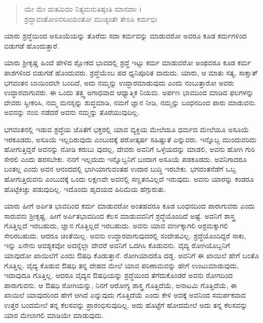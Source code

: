 \begin{verse}
ಯೇ ಮೇ ಮತಮಿದಂ ನಿತ್ಯಮನುತಿಷ್ಠಂತಿ ಮಾನವಾಃ ।\\ಶ್ರದ್ಧಾವಂತೋಽನಸೂಯಂತೋ ಮುಚ್ಯಂತೇ ತೇಽಪಿ ಕರ್ಮಭಿಃ 
\end{verse}

{\small ಯಾರು ಶ್ರದ್ಧೆಯಿಂದ ಅಸೂಯೆಯನ್ನು ತೊರೆದು ಸದಾ ಕರ್ಮವನ್ನು ಮಾಡುವರೋ ಅವರೂ ಕೂಡ ಕರ್ಮಗಳಿಂದ ಬಿಡುಗಡೆ ಹೊಂದುತ್ತಾರೆ.}

ಯಾರು ಶ್ರೀಕೃಷ್ಣ ಹಿಂದೆ ಹೇಳಿದ ಶ್ಲೋಕದ ಭಾವದಲ್ಲಿ ಶ್ರದ್ಧೆ ಇಟ್ಟು ಕರ್ಮ ಮಾಡುವರೋ ಅಂಥವರೂ ಕೂಡ ಕರ್ಮ ಪಾಶಗಳಿಂದ ಬಿಡುಗಡೆ ಹೊಂದುವರು. ಶ್ರದ್ಧೆಯೆಂಬ ಪದ ಧ್ವನಿಪೂರಿತ ವಾದುದು. ಯಾರು, ಆ ಮಾತು ಸತ್ಯ, ಸಾಕ್ಷಾತ್ ಭಗವಂತನ ಬಾಯಿಂದಲೇ ಬಂದಿದೆ, ಅದು ನಮ್ಮನ್ನು ಉದ್ಧಾರಮಾಡುವುದು ಎಂದು ನಂಬುತ್ತಾರೋ ಅವರು ಉದ್ಧಾರವಾಗುವರು. ಈ ಒಂದು ತತ್ತ್ವ ಅಗಾಧವಾದ ಆಧ್ಯಾತ್ಮಿಕ ನಿಯಮ. ಅರ್ಪಣ ಭಾವದಿಂದ ಮಾಡಿದ ಫಲಗಳನ್ನು ದೇವರು ಸ್ವೀಕರಿಸಿ, ನಮ್ಮ ಮನಸ್ಸನ್ನು ಶುದ್ಧಮಾಡಿ, ನಮಗೆ ಜ್ಞಾನ ನೀಡಿ, ನಮ್ಮನ್ನು ಬಂಧನದಿಂದ ಪಾರು ಮಾಡುವನು. ಅವನನ್ನು ನಂಬಿ ನಡೆದರೆ ಅವನು ನಮ್ಮನ್ನು ತೊರೆಯುವುದಿಲ್ಲ.

ಭಗವಂತನಲ್ಲಿ ಇಡುವ ಶ್ರದ್ಧೆಯ ಜೊತೆಗೆ ಭಕ್ತರಲ್ಲಿ ಯಾವ ವ್ಯಕ್ತಿಯ ಮೇಲೆಯೂ ಧರ್ಮದ ಮೇಲೆಯೂ ಅಸೂಯೆ ಇರಕೂಡದು, ಅಸೂಯೆ ಇಲ್ಲದಿರುವುದು ಎಂಬುದಕ್ಕೆ ಪರೋತ್ಕರ್ಷ ಸಹಿಷ್ಣುತೆ ಎನ್ನುವರು. ಇನ್ನೊಬ್ಬ ಮುಂದುವರಿದು ಹೋಗುತ್ತಿದ್ದರೆ ಅವನನ್ನು ನೋಡಿ ಕರುಬು ವುದಲ್ಲ, ದೇವರು ಅವನಿಗೆ ಒಳ್ಳೆಯದನ್ನು ಮಾಡಲಿ, ಅವನು ಹೋಗಿ ಗುರಿ ಸೇರಲಿ ಎಂದು ಹರಸಬೇಕು. ನನಗೆ ಇಲ್ಲದುದು ಇನ್ನೊಬ್ಬನಿಗೆ ಬಂದಾಗ ಅಸೂಯೆ ಪಡಕೂಡದು. ಅವನಿಗಾದರೂ ಬಂತಲ್ಲ ಎಂದು ಅವನ ಆನಂದದಲ್ಲಿ ಭಾಗಿಯಾಗುವಂತಹ ಉದಾರ ಬುದ್ಧಿ ಇರಬೇಕು. ಭಗವಂತನೆಡೆಗೆ ಒಬ್ಬ ಹೋಗುತ್ತಿರುವನು ಎಂಬುದಕ್ಕೆ ಒಂದು ಲಕ್ಷಣವೇ ಅವನಲ್ಲಿ ಸಣ್ಣತನವಿಲ್ಲದೆ ಇರುವುದು. ಅವನು ಯಾರನ್ನು ಕಂಡರೂ ಹೊಟ್ಟೆಕಿಚ್ಚು ಪಡುವುದಿಲ್ಲ. ಇದೊಂದು ಹೃದಯದ ಹಿರಿಮೆಯ ಹೆಗ್ಗುರುತು.

ಯಾರು ಹೀಗೆ ಅರ್ಪಿತ ಭಾವದಿಂದ ಕರ್ಮ ಮಾಡುವರೋ ಅಂತಹವರೂ ಕೂಡ ಬಂಧನದಿಂದ ಪಾರಾಗುವರು ಎಂದು ಸಾರುವನು ಶ್ರೀಕೃಷ್ಣ. ಹೀಗೆ ಅರ್ಪಿತಭಾವದಿಂದ ಕೆಲಸ ಮಾಡುವವನಿಗೆ ಶ್ರದ್ಧೆಯೊಂದಿದೆ ಅಷ್ಟೆ. ಅವನಿಗೆ ಶಾಸ್ತ್ರ ಗೊತ್ತಿಲ್ಲದೆ ಇರಬಹುದು, ಜ್ಞಾನ ಗೊತ್ತಿಲ್ಲದೆ ಇರಬಹುದು. ಅವನು ಯಾವ ವರ್ಣಕ್ಕಾಗಲಿ ಆಶ್ರಮಕ್ಕಾಗಲಿ ಸೇರಿರಬಹುದು. ಆದರೂ ಚಿಂತೆಯಿಲ್ಲ. ಅವನು ಉದ್ಧಾರವಾಗುವುದರಲ್ಲಿ ಸಂದೇಹವಿಲ್ಲ. ಶ್ರದ್ಧೆಯೊಂದಿದ್ದರೆ ಸಾಕು, ಇನ್ನು ಏನೇನು ಆವಶ್ಯಕವೋ ಅದನ್ನೆಲ್ಲಾ ದೇವರೆ ಅವನಿಗೆ ಒದಗಿಸಿ ಕೊಡುವನು. ವೈದ್ಯ ರೋಗಿಯೊಬ್ಬನಿಗೆ ಯಾವುದೋ ಖಾಯಿಲೆಗೆ ಎಂದು ಔಷಧಿ ಕೊಡುತ್ತಾನೆ. ರೋಗಿಯಾದರೊ ದಡ್ಡ. ಅವನಿಗೆ ಈ ಖಾಯಿಲೆ ಹೇಗೆ ಬಂತೊ ಗೊತ್ತಿಲ್ಲ. ವೈದ್ಯ ಕೊಡುವ ಔಷಧಿ ತನ್ನ ದೇಹದ ಮೇಲೆ ಯಾವ ಪರಿಣಾಮವನ್ನು ಹೇಗೆ ಉಂಟುಮಾಡುವುದು, ಇದಾವುದೂ ಗೊತ್ತಿಲ್ಲ. ಆದರೂ ವೈದ್ಯನ ಔಷಧಿಯನ್ನು ಶ್ರದ್ಧೆಯಿಂದ ತೆಗೆದುಕೊಂಡರೆ ಅವನು ರೋಗದಿಂದ ಪಾರಾಗುವನು. ಆ ಔಷಧಿ ರೋಗಿಯನ್ನು, ನಿನಗೆ ಆರೋಗ್ಯ ಶಾಸ್ತ್ರ ಗೊತ್ತಿದೆಯೆ, ಅನಾಟಮಿ ಗೊತ್ತಿದೆಯೆ, ಈ ಖಾಯಿಲೆ ಯಾವುದರಿಂದ ಹೇಗೆ ಆಗಿದೆ ಎನ್ನುವುದು ಗೊತ್ತಿದೆಯೆ ಎಂದು ಕೇಳಿ ಅದಕ್ಕೆ ಅವನಿಂದ ಸಮರ್ಪಕವಾದ ಉತ್ತರ ಬಂದಮೇಲೆ ತನ್ನ ಕೆಲಸವನ್ನು ಪ್ರಾರಂಭಿಸುವುದಿಲ್ಲ. ಅದು ಹೊಟ್ಟೆಗೆ ಹೋದಮೇಲೆ ಅದು ತನ್ನ ಕೆಲಸವನ್ನು ಯಾರ ಮೇಲಾಗಲಿ ಮಾಡಿಯೇ ಮಾಡುವುದು.

